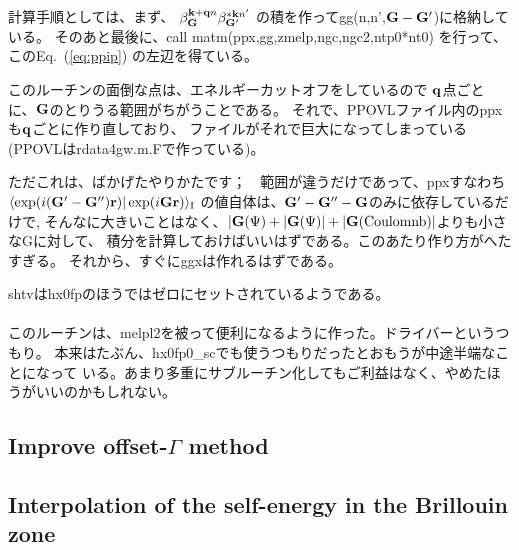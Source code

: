 \documentclass[twocolumn,showpacs,preprintnumbers,amsmath,amssymb,floatfix]{revtex4-1}
\newcommand{\bfq}{{\bf q}}
\newcommand{\bfk}{{\bf k}}
\newcommand{\bfr}{{\bf r}}
\newcommand{\bfG}{{\bf G}}
\newcommand{\req}[1]{\mbox{Eq.~\!(\ref{#1})}}
\begin{document}
\begin{widetext}
計算手順としては、まず、
$\beta^{\bfk+\bfq n}_{\bfG} \beta^{* \bfk n'}_{\bfG'}$
の積を作ってgg(n,n',$\bfG-\bfG'$)に格納している。
そのあと最後に、call matm(ppx,gg,zmelp,ngc,ngc2,ntp0*nt0)
を行って、この\req{eq:ppip} の左辺を得ている。

このルーチンの面倒な点は、エネルギーカットオフをしているので
$\bfq$点ごとに、$\bfG$のとりうる範囲がちがうことである。
それで、PPOVLファイル内のppxも$\bfq$ごとに作り直しており、
ファイルがそれで巨大になってしまっている(PPOVLはrdata4gw.m.Fで作っている)。

ただこれは、ばかげたやりかたです；　範囲が違うだけであって、ppxすなわち
$\langle \exp(i (\bfG'- \bfG'')\bfr) |\exp(i \bfG\bfr)\rangle_{\rm I}$
の値自体は、$\bfG'- \bfG''-\bfG$のみに依存しているだけで,
そんなに大きいことはなく、$|\bfG(\Psi)+|\bfG(\Psi)|+|\bfG({\rm Coulomnb})|$よりも小さなGに対して、
積分を計算しておけばいいはずである。このあたり作り方がへたすぎる。
それから、すぐにggxは作れるはずである。

shtvはhx0fpのほうではゼロにセットされているようである。\\

\\
このルーチンは、melpl2を被って便利になるように作った。ドライバーというつもり。
本来はたぶん、hx0fp0\_scでも使うつもりだったとおもうが中途半端なことになって
いる。あまり多重にサブルーチン化してもご利益はなく、やめたほうがいいのかもしれない。

\end{widetext}

\subsection{Improve offset-$\Gamma$ method}
\label{sec:kint}

\subsection{Interpolation of the self-energy in the Brillouin zone}
\end{document}
